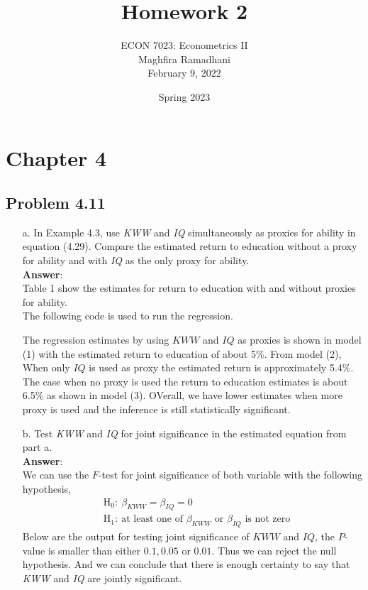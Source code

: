 \documentclass[10pt]{article}
\begin{document}
 
\title{Homework 2}
\author{ECON 7023: Econometrics II\\
Maghfira Ramadhani\\
February 9, 2022}
\date{Spring 2023}
\maketitle

\section*{Chapter 4}
\subsection*{Problem 4.11}
\begin{enumerate}
\item[a.] In Example 4.3, use \textit{KWW} and \textit{IQ} simultaneously as proxies for ability in equation (4.29). Compare the estimated return to education without a proxy for ability and with \textit{IQ} as the only proxy for ability.
\\ \textbf{Answer}: \\
Table 1 show the estimates for return to education with and without proxies for ability.
\\
The following code is used to run the regression.

The regression estimates by using $KWW$ and $IQ$ as proxies is shown in model (1) with the estimated return to education of about 5\%. From model (2), When only $IQ$ is used as proxy the estimated return is approximately 5.4\%. The case when no proxy is used the return to education estimates is about 6.5\% as shown in model (3). OVerall, we have lower estimates when more proxy is used and the inference is still statistically significant.

\item[b.] Test \textit{KWW} and \textit{IQ} for joint significance in the estimated equation from part a.
\\ \textbf{Answer}:\\
We can use the $F$-test for joint significance of both variable with the following hypothesis,
\begin{align*}
    &\text{H}_0:\ \beta_{KWW}=\beta_{IQ}=0\\
    &\text{H}_1:\ \text{at least one of }\beta_{KWW}\text{ or }\beta_{IQ} \text{ is not zero}
\end{align*}
Below are the output for testing joint significance of $KWW$ and $IQ$, the $P$-value is smaller than either $0.1, 0.05$ or $0.01$. Thus we can reject the null hypothesis. And we can conclude that there is enough certainty to say that \textit{KWW} and \textit{IQ} are jointly significant.



\end{enumerate}
\end{document}
